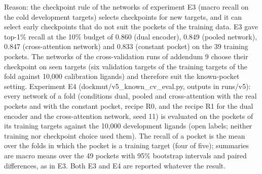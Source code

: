 Reason: the checkpoint rule of the networks of experiment E3 (macro recall on the cold development targets) selects checkpoints for new targets, and it can select early checkpoints that do not suit the pockets of the training data. E3 gave top-1\% recall at the 10\% budget of 0.860 (dual encoder), 0.849 (pooled network), 0.847 (cross-attention network) and 0.833 (constant pocket) on the 39 training pockets. The networks of the cross-validation runs of addendum 9 choose their checkpoint on seen targets (six validation targets of the training targets of the fold against 10,000 calibration ligands) and therefore suit the known-pocket setting. Experiment E4 (dockmut/v5\_known\_cv\_eval.py, outputs in runs/v5): every network of a fold (conditions dual, pooled and cross-attention with the real pockets and with the constant pocket, recipe R0, and the recipe R1 for the dual encoder and the cross-attention network, seed 11) is evaluated on the pockets of its training targets against the 10,000 development ligands (open labels; neither training nor checkpoint choice used them). The recall of a pocket is the mean over the folds in which the pocket is a training target (four of five); summaries are macro means over the 49 pockets with 95\% bootstrap intervals and paired differences, as in E3. Both E3 and E4 are reported whatever the result.
